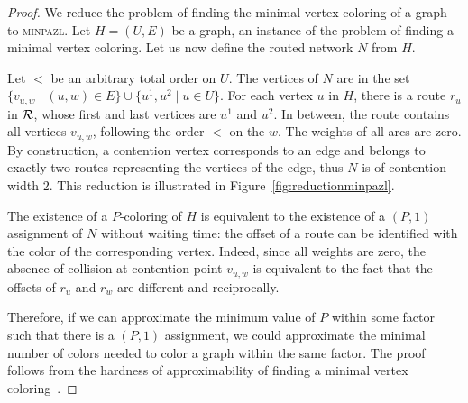 \documentclass[a4paper,10pt]{journal}
\newcommand\minpazl{\textsc{minpazl}\xspace}
\begin{document}
\begin{proof}
 We reduce the problem of finding the minimal vertex coloring of a graph to \minpazl. Let $H = (U,E)$ be a graph, an instance of the problem of finding a minimal vertex coloring.  Let us now define the routed network $N$ from $H$.
 
 Let $<$ be an arbitrary total order on $U$. 
 The vertices of $N$ are in the set $\{v_{u,w} \mid (u,w) \in E\} \cup \{u^1, u^2 \mid u \in U\}$. 
 For each vertex $u$ in $H$, there is a route $r_u$ in ${\cal R}$, whose first and last vertices
 are $u^1$ and $u^2$. In between, the route contains all vertices $v_{u,w}$, following the order $<$ on the $w$. The weights of all arcs are zero. By construction, a contention vertex corresponds to an edge and belongs to exactly two routes representing the vertices of the edge, thus $N$ is of contention width $2$. This reduction is illustrated in Figure~\ref{fig:reductionminpazl}.

  The existence of a $P$-coloring of $H$ is equivalent to the existence of a $(P,1)$ assignment of $N$ without waiting time: the offset of a route can be identified with the color of the corresponding vertex. Indeed, since all weights are zero, the absence of collision at contention point $v_{u,w}$ is equivalent to the fact that the offsets of $r_u$ and $r_w$ are different and reciprocally.

   Therefore, if we can approximate the minimum value of $P$ within some factor such that there is a $(P,1)$ assignment, we could approximate the minimal number of colors needed to color a graph within the same factor. The proof follows from the hardness of approximability of finding a minimal vertex coloring~\cite{zuckerman2006linear}.
\end{proof}
\end{document}
